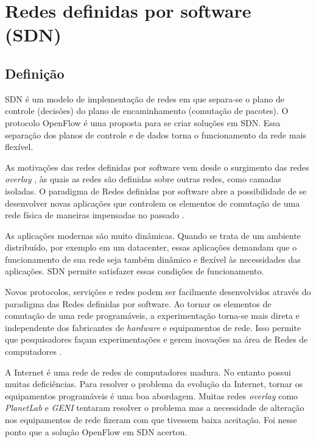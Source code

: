 \section{Redes definidas por software (SDN)}


\subsection{Definição}
SDN é um modelo de implementação de redes em que separa-se o plano de controle
(decisões) do plano de encaminhamento (comutação de pacotes). 
O protocolo OpenFlow \citep{nick2008openflow} é uma proposta para se 
criar soluções em SDN. 
Essa separação dos planos de controle e de dados torna o funcionamento da
rede mais flexível.

As motivações das redes definidas por software vem desde o surgimento das 
redes \emph{overlay} \citep{clark2006overlay}, às quais as redes são definidas
sobre outras redes, como camadas isoladas.
O paradigma de Redes definidas por software abre a possibilidade de se 
desenvolver novas aplicações que controlem os elementos de comutação de uma
rede física de maneiras impensadas no passado \citep{guedes2012redes}.

As aplicações modernas são muito dinâmicas. 
Quando se trata de um ambiente distribuído, por exemplo em um datacenter, 
essas aplicações demandam que o funcionamento de sua rede seja também 
dinâmico e flexível às necessidades das aplicações. 
SDN permite satisfazer essas condições de funcionamento. 

Novos protocolos, servições e redes podem ser facilmente desenvolvidos através
do paradigma das Redes definidas por software.
Ao tornar os elementos de comutação de uma rede programáveis, a 
experimentação torna-se mais direta e independente dos fabricantes de 
\emph{hardware} e equipamentos de rede. 
Isso permite que pesquisadores façam experimentações e gerem inovações 
na área de Redes de computadores \citep{nick2008openflow}.

A Internet é uma rede de redes de computadores madura. 
No entanto possui muitas deficiências. 
Para resolver o problema da evolução da Internet, tornar os equipamentos 
programáveis é uma boa abordagem.
Muitas redes \emph{overlay} como \emph{PlanetLab} 
\citep{peterson2006experiences} e \emph{GENI} \citep{berman2014geni} tentaram
resolver o problema mas a necessidade de alteração nos equipamentos de rede
fizeram com que tivessem baixa aceitação.
Foi nesse ponto que a solução OpenFlow em SDN acertou.


